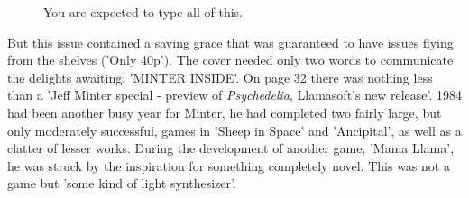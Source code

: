 \clearpage
\begin{figure}[H]
    \centering
    \begin{adjustbox}{width=12cm,center}
    \end{adjustbox}
\caption{You are expected to type all of this.}
\end{figure}
But this issue contained a saving grace that was guaranteed to have issues flying from the shelves ('Only 40p'). The cover needed only two
 words to communicate the delights awaiting: 'MINTER INSIDE'. On page 32 there was nothing less than a 'Jeff Minter special - preview of
\textit{Psychedelia}, Llamasoft's new release'. 1984 had been another busy year for Minter, he had completed two fairly large, but only
moderately successful, games in 'Sheep in Space' and 'Ancipital', as well as a clatter of lesser works. During the development of another
game, 'Mama Llama', he was struck by the inspiration for something completely novel. This was not a game but 'some kind of light synthesizer'.

